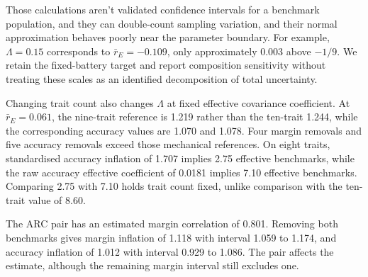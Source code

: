 Those calculations aren't validated confidence intervals for a benchmark population, and they can double-count sampling variation, and their normal approximation behaves poorly near the parameter boundary. For example, $\Lambda=0.15$ corresponds to $\bar r_E=-0.109$, only approximately 0.003 above $-1/9$. We retain the fixed-battery target and report composition sensitivity without treating these scales as an identified decomposition of total uncertainty.

Changing trait count also changes $\Lambda$ at fixed effective covariance coefficient. At $\bar r_E=0.061$, the nine-trait reference is 1.219 rather than the ten-trait 1.244, while the corresponding accuracy values are 1.070 and 1.078. Four margin removals and five accuracy removals exceed those mechanical references. On eight traits, standardised accuracy inflation of 1.707 implies 2.75 effective benchmarks, while the raw accuracy effective coefficient of 0.0181 implies 7.10 effective benchmarks. Comparing 2.75 with 7.10 holds trait count fixed, unlike comparison with the ten-trait value of 8.60.

The ARC pair has an estimated margin correlation of 0.801. Removing both benchmarks gives margin inflation of 1.118 with interval 1.059 to 1.174, and accuracy inflation of 1.012 with interval 0.929 to 1.086. The pair affects the estimate, although the remaining margin interval still excludes one.

